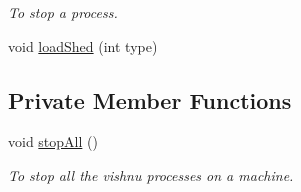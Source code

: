 \begin{DoxyCompactItemize}
\begin{DoxyCompactList}\small\item\em To stop a process. \item\end{DoxyCompactList}\item 
void \hyperlink{classProcessCtl_a573af8bdace41dc46472acadf7e222d7}{loadShed} (int type)
\end{DoxyCompactItemize}
\subsection*{Private Member Functions}
\begin{DoxyCompactItemize}
\item 
\hypertarget{classProcessCtl_af8eebb6eb14d7b02a452e27e9d146313}{
void \hyperlink{classProcessCtl_af8eebb6eb14d7b02a452e27e9d146313}{stopAll} ()}
\label{classProcessCtl_af8eebb6eb14d7b02a452e27e9d146313}

\begin{DoxyCompactList}\small\item\em To stop all the vishnu processes on a machine. \item\end{DoxyCompactList}\end{DoxyCompactItemize}
